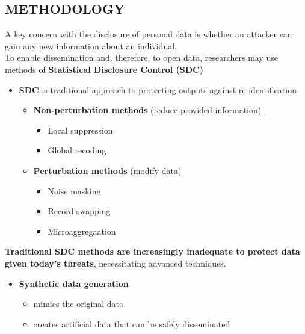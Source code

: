 \documentclass[a0,portrait]{a0poster}
\begin{document}
\begin{multicols}{3}
\section{METHODOLOGY}

A key concern with the disclosure of personal data is whether an attacker can gain any new information about an individual. \\
To enable dissemination and, therefore, to open data, researchers may use methods of \textbf{Statistical Disclosure Control (SDC)} \cite{2012_Hundepool}

\vspace{1cm}
\begin{itemize}
    \item[\ding{228}]  \textbf{SDC} is traditional approach to protecting outputs against re-identification
        \begin{itemize}
            \item \textbf{Non-perturbation methods} (reduce provided information)
                \begin{itemize}
                    \item Local suppression %
                    \item Global recoding %
                \end{itemize}   
\columnbreak %
\vspace{1cm}
            \item \textbf{Perturbation methods} (modify data)
                \begin{itemize}
                    \item Noise masking
                    \item Record swapping
                    \item Microaggregaation
                \end{itemize}             
        \end{itemize}   
\end{itemize}

\textbf{Traditional SDC methods are increasingly inadequate to protect data given today's threats}, necessitating advanced techniques. 

\begin{itemize}
     \item[\ding{228}] \textbf{Synthetic data generation}
        \begin{itemize}
            \item mimics the original data
            \item creates artificial data that can be safely disseminated
        \end{itemize}        
\end{itemize}


\end{multicols}
\end{document}
